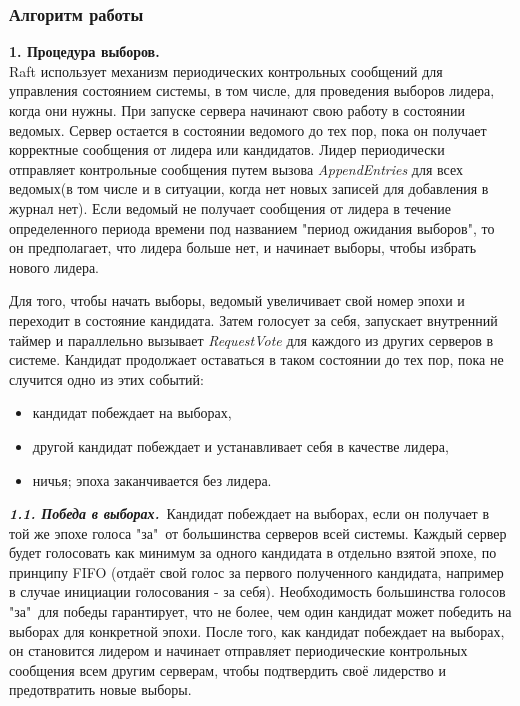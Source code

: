 \documentclass[subf, href, colorlinks=true, 14pt,
times, mtpro, specialist]{disser}
\theoremstyle{definition}
\begin{document}
\subsubsection{Алгоритм  работы}

\textbf{1. Процедура выборов.}\\
Raft использует механизм периодических контрольных сообщений для управления состоянием системы, в том числе, для проведения выборов лидера, когда они нужны. При запуске сервера начинают свою работу в состоянии ведомых. Сервер остается в состоянии ведомого до тех пор, пока он получает корректные сообщения от лидера или кандидатов. Лидер периодически отправляет контрольные сообщения путем вызова \emph{AppendEntries} для всех ведомых(в том числе и в ситуации, когда нет новых записей для добавления в журнал нет). Если ведомый не получает сообщения от лидера в течение определенного периода времени под названием "период ожидания выборов", то он предполагает, что лидера
больше нет, и начинает выборы, чтобы избрать нового лидера. 

Для того, чтобы начать выборы, ведомый увеличивает свой номер эпохи и переходит в состояние кандидата. Затем голосует за себя, запускает внутренний таймер и параллельно вызывает \emph{RequestVote} для каждого из других серверов в системе. Кандидат продолжает оставаться в таком состоянии до тех пор, пока не случится одно из этих событий:
\begin{itemize}
\item кандидат побеждает на выборах,
\item другой кандидат побеждает и устанавливает себя в качестве лидера,
\item ничья; эпоха заканчивается без лидера.
\end{itemize}

\textbf{\textit{1.1. Победа в выборах.}}\
Кандидат побеждает на выборах, если он получает в той же эпохе голоса "за"\ от большинства серверов всей системы. Каждый сервер будет голосовать как минимум за одного кандидата в отдельно взятой эпохе, по принципу FIFO (отдаёт свой голос за первого полученного кандидата, например в случае инициации голосования - за себя). Необходимость большинства голосов "за"\ для победы гарантирует, что не более, чем один кандидат может победить на выборах для конкретной эпохи. После того, как кандидат побеждает на выборах, он становится лидером и начинает отправляет периодические контрольных сообщения всем другим серверам, чтобы подтвердить своё лидерство и предотвратить новые выборы.
\end{document}
